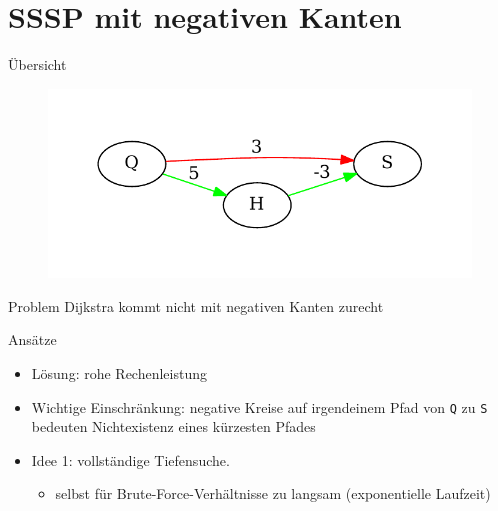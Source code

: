 \section{SSSP mit negativen Kanten}
\begin{frame}{Übersicht}
\begin{figure}[htbp]
\centering
\includegraphics[width=\linewidth]{dijkstra_gegenbeispiel.pdf}
\end{figure}
\begin{alertblock}{Problem}
Dijkstra kommt nicht mit negativen Kanten zurecht
\end{alertblock}
\end{frame}

\begin{frame}{Ansätze}
\begin{itemize}
\item
  Lösung: rohe %
  Rechenleistung
\item
  Wichtige Einschränkung: negative Kreise auf irgendeinem Pfad von
  \texttt{Q} zu \texttt{S} bedeuten Nichtexistenz eines kürzesten Pfades
\item
  Idee 1: vollständige Tiefensuche.

  \begin{itemize}
  \item
    selbst für Brute-Force-Verhältnisse zu langsam (exponentielle
    Laufzeit)
  \end{itemize}
\end{itemize}
\end{frame}

